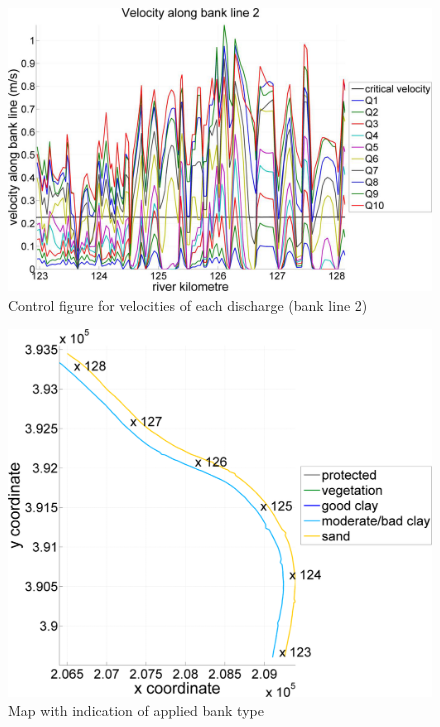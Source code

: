 \begin{figure}
\includegraphics[width=\textwidth]{figures/Fig2-11.png}
\caption{Control figure for velocities of each discharge (bank line 2)}
\label{Fig2.11}
\end{figure}

\begin{figure}
\includegraphics[width=\textwidth]{figures/Fig2-12.png}
\caption{Map with indication of applied bank type}
\label{Fig2.12}
\end{figure}

